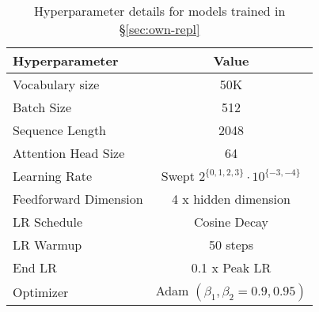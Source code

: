 \begin{table}[H]
    \centering
\begin{tabular}{lc}
\toprule
 Hyperparameter & Value \\ \midrule
Vocabulary size & 50K \\
Batch Size &    512	\\
Sequence Length & 2048	\\
Attention Head Size & 64 \\
Learning Rate & Swept $2^{\{0, 1, 2, 3\}} \cdot 10^{\{-3, -4 \}}$ \\
Feedforward Dimension & 4 x hidden dimension \\
LR Schedule & Cosine Decay \\
LR Warmup & 50 steps \\
End LR & 0.1 x Peak LR \\
Optimizer & Adam $(\beta_1, \beta_2 = 0.9, 0.95)$ \\
\bottomrule
\end{tabular}%
    \caption{\small{Hyperparameter details for models trained in \S\ref{sec:own-repl}}}
\label{tab:hparams} 
\end{table}